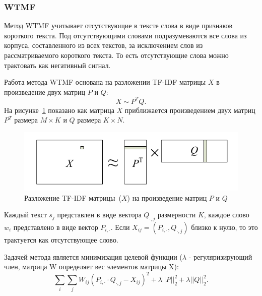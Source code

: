     \subsubsection{WTMF}
    \label{subsubsec:wtmf}
        Метод WTMF учитывает отсутствующие в тексте слова в виде признаков короткого текста.
        Под отсутствующими словами подразумеваются все слова из корпуса, составленного из всех текстов, за исключением слов из рассматриваемого короткого текста.
        То есть отсутствующие слова можно трактовать как негативный сигнал.

        Работа метода WTMF основана на разложении TF-IDF матрицы $X$ в произведение двух матриц $P$ и $Q$:
        $$X \sim P^TQ.$$
        На рисунке~\ref{pic:wtmf} показано как матрица $X$ приближается произведением двух матриц $P^T$ размера $M \times K$ и $Q$ размера $K \times N$.

        \begin{figure}[h!]
            \center
            \includegraphics[scale=0.45]{wtmf.png}
            \caption{Разложение TF-IDF матрицы~($X$) на произведение матриц $P$ и $Q$}
            \label{pic:wtmf}
        \end{figure}

        Каждый текст $s_j$ представлен в виде вектора $Q_{\cdot,j}$ размерности $K$, каждое слово $w_i$ представлено в виде вектор $P_{i,\cdot}$.
        Если $X_{ij}=(P_{i,\cdot}, Q_{\cdot,j})$ близко к нулю, то это трактуется как отсутствующее слово.

        Задачей метода является минимизация целевой функции ($\lambda$ - регуляризирующий член, матрица W определяет вес элементов матрицы X):
        $$\sum_i \sum_j W_{ij} (P_{i,\cdot} \cdot Q_{\cdot,j} - X_{ij})^2 + \lambda ||P||^2_2 + \lambda ||Q||^2_2.$$

